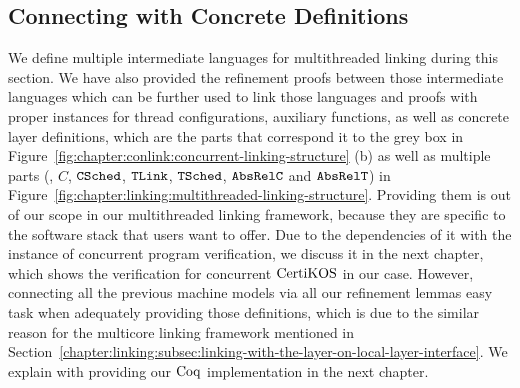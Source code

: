 \subsection{Connecting with Concrete Definitions}
\label{chapter:linking:subsec:connecting-with-thread-local-machine-model}

We define multiple intermediate languages for multithreaded linking during this section.
We have also provided the refinement proofs between those intermediate languages which can be further used to link those languages and proofs  
with proper instances for thread configurations, auxiliary functions, as well as 
concrete layer definitions,
which are the parts that correspond it to the grey box in Figure~\ref{fig:chapter:conlink:concurrent-linking-structure} (b) as well as 
multiple parts (\ie, $C$, ${{\mathrm{\texttt{CSched}}}}$, ${{\mathrm{\texttt{TLink}}}}$, ${{\mathrm{\texttt{TSched}}}}$, ${\mathrm{\texttt{AbsRelC}}}$ and ${\mathrm{\texttt{AbsRelT}}}$)
in Figure~\ref{fig:chapter:linking:multithreaded-linking-structure}. 
Providing them is out of our scope in our multithreaded linking framework,
because they are specific to the software stack that users want to offer. 
Due to the dependencies of it with the instance of concurrent program verification, 
we discuss it in the next chapter, which shows the verification for concurrent $\mathrm{CertiKOS}$ in our case. 
However, connecting all the previous machine models via
all our refinement lemmas 
easy task when adequately providing those definitions, which is due to the similar reason for the multicore linking framework mentioned in Section~\ref{chapter:linking:subsec:linking-with-the-layer-on-local-layer-interface}.
We explain with providing our $\mathrm{Coq}$ implementation in the next chapter.

